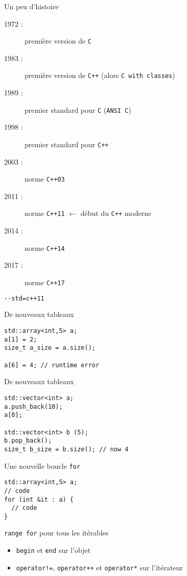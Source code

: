 
\begin{frame}[fragile]{Un peu d'histoire}
  \begin{description}
  \item[1972 :] première version de \texttt{C}
  \item[1983 :] première version de \texttt{C++} (alors \texttt{C with classes})
  \item[1989 :] premier standard pour \texttt{C} (\texttt{ANSI C})
  \item[1998 :] premier standard pour \texttt{C++}
  \item[2003 :] norme \texttt{C++03}
  \item[2011 :] norme \texttt{C++11} $\leftarrow$ début du \texttt{C++} moderne
  \item[2014 :] norme \texttt{C++14}
  \item[2017 :] norme \texttt{C++17}
  \end{description}
  \begin{lstlisting}[language=bash]
    --std=c++11
  \end{lstlisting}
\end{frame}

\begin{frame}[fragile]{De nouveaux tableaux}
  \begin{lstlisting}
std::array<int,5> a;
a[1] = 2;
size_t a_size = a.size();

a[6] = 4; // runtime error
  \end{lstlisting}
\end{frame}

\begin{frame}[fragile]{De nouveaux tableaux}
  \begin{lstlisting}
std::vector<int> a;
a.push_back(10);
a[0];

std::vector<int> b (5);
b.pop_back();
size_t b_size = b.size(); // now 4
  \end{lstlisting}
\end{frame}

\begin{frame}[fragile]{Une nouvelle boucle \texttt{for}}
  \begin{lstlisting}
std::array<int,5> a;
// code
for (int &it : a) {
  // code
}
  \end{lstlisting}
  \texttt{range for} pour tous les itérables
  \begin{itemize}
  \item \texttt{begin} et \texttt{end} sur l'objet
  \item \texttt{operator!=}, \texttt{operator++} et \texttt{operator*} sur l'itérateur
  \end{itemize}
\end{frame}

